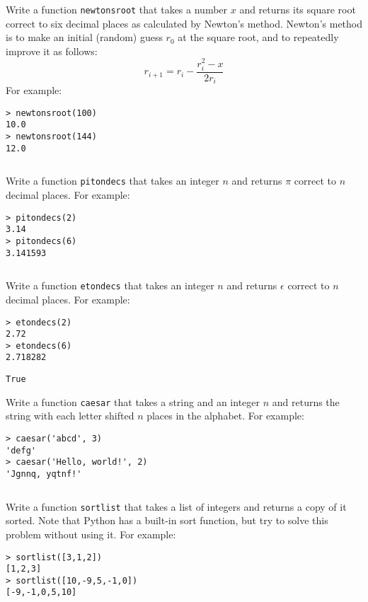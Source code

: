 \documentclass[a4paper, 12pt]{exam}
\begin{document}
\begin{questions}
\question
Write a function \texttt{newtonsroot} that takes a number \( x \) and returns its square root correct to six decimal places as calculated by Newton's method.
Newton's method is to make an initial (random) guess \( r_0 \) at the square root, and to repeatedly improve it as follows:
\[ r_{i+1} = r_i - \frac{r_i^2 - x}{2 r_i} \]
For example:
\begin{verbatim}
> newtonsroot(100)
10.0
> newtonsroot(144)
12.0
\end{verbatim}

\begin{solution}
  \inputminted{python}{solutions/newtonsroot.py}
\end{solution}


\question
Write a function \texttt{pitondecs} that takes an integer \( n \) and returns \( \pi \) correct to \( n \) decimal places.
For example:
\begin{verbatim}
> pitondecs(2)
3.14
> pitondecs(6)
3.141593
\end{verbatim}

\begin{solution}
  \inputminted{python}{solutions/pitondecs.py}
\end{solution}


\question
Write a function \texttt{etondecs} that takes an integer \( n \) and returns \( \epsilon \) correct to \( n \) decimal places.
For example:
\begin{verbatim}
> etondecs(2)
2.72
> etondecs(6)
2.718282
\end{verbatim}

\begin{solution}
  \begin{verbatim}
True
  \end{verbatim}
\end{solution}

\question
Write a function \texttt{caesar} that takes a string and an integer $n$ and returns the string with each letter shifted $n$ places in the alphabet.
For example:
\begin{verbatim}
> caesar('abcd', 3)
'defg'
> caesar('Hello, world!', 2)
'Jgnnq, yqtnf!'
\end{verbatim}
 
\begin{solution}
  \inputminted{python}{solutions/caesar.py}
\end{solution}


\question
Write a function \texttt{sortlist} that takes a list of integers and returns a copy of it sorted.
Note that Python has a built-in sort function, but try to solve this problem without using it.
For example:
\begin{verbatim}
> sortlist([3,1,2])
[1,2,3]
> sortlist([10,-9,5,-1,0])
[-9,-1,0,5,10]
\end{verbatim}


\end{questions}
\end{document}
